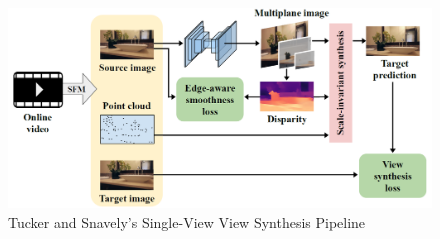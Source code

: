\begin{figure}[!h]
    \includegraphics[width=1\columnwidth]{figures/tucker-snavely-pipeline.png}
    \caption{Tucker and Snavely's Single-View View Synthesis Pipeline~\cite{single_view_mpi}}
    \label{fig:tucker-snavely-pipeline}
\end{figure}

